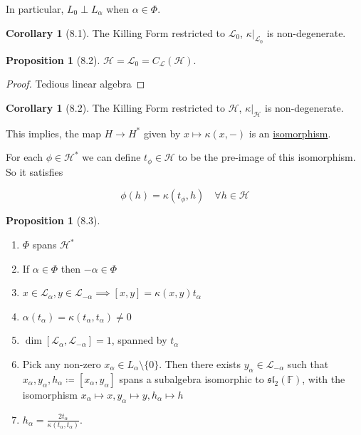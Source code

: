 \documentclass{article}
\theoremstyle{definition}
\newtheorem{proposition}[theorem]{Proposition}
\newtheorem{corollary}[theorem]{Corollary}
\begin{document}
In particular, \(L_0 \perp L_\alpha\) when \(\alpha \in \Phi\). 

\begin{corollary}[8.1]
    The Killing Form restricted to \(\mathcal{L}_0\), \(\kappa|_{\mathcal{L}_0}\) is non-degenerate. 
\end{corollary}

\begin{proposition}
    [8.2] \(\mathcal{H} = \mathcal{L}_0 = C_{\mathcal{L}}(\mathcal{H})\).
\end{proposition}

\begin{proof}
    Tedious linear algebra
\end{proof}

\begin{corollary}
    [8.2] The Killing Form restricted to \(\mathcal{H}\), \(\kappa |_{\mathcal{H}}\) is non-degenerate.
\end{corollary}

This implies, the map \(H \to H^{\ast}\) given by \(x \mapsto \kappa (x,-)\) is an \underline{isomorphism}.

For each \(\phi \in \mathcal{H} ^{\ast}\) we can define \(t_{\phi} \in \mathcal{H} \) to be the pre-image of this isomorphism. So it satisfies

\[
    \phi(h) = \kappa (t_{\phi}, h) \quad \forall h\in \mathcal{H}
\]

\begin{proposition}
    [8.3]

    \begin{enumerate}[label=\arabic*)]
        \item \(\Phi\) spans \(\mathcal{H} ^{\ast}\) 
        \item If \(\alpha \in \Phi\) then \(-\alpha \in \Phi\)
        \item \(x\in \mathcal{L}_\alpha, y\in \mathcal{L}_{-\alpha} \implies [x,y] = \kappa (x,y)t_\alpha\)
        \item \(\alpha(t_\alpha) = \kappa (t_\alpha , t_\alpha) \neq 0\) 
        \item \(\dim [\mathcal{L}_\alpha, \mathcal{L}_{-\alpha}] = 1\), spanned by \(t_\alpha\)  
        \item Pick any non-zero \(x_\alpha\in L_\alpha \setminus \{ 0 \}\). Then there exists \(y_\alpha \in \mathcal{L}_{-\alpha}\) such that \(x_\alpha , y_\alpha , h_\alpha \coloneqq [x_\alpha , y_\alpha]\) spans a subalgebra isomorphic to \(\mathfrak{sl}_2(\mathbb{F})\), with the isomorphism \(x_\alpha \mapsto x, y_\alpha \mapsto y, h_\alpha \mapsto h\) 
        \item \(h_\alpha = \frac{2 t_\alpha}{\kappa (t_\alpha , t_\alpha )}\).  
    \end{enumerate} 
\end{proposition}
\end{document}
